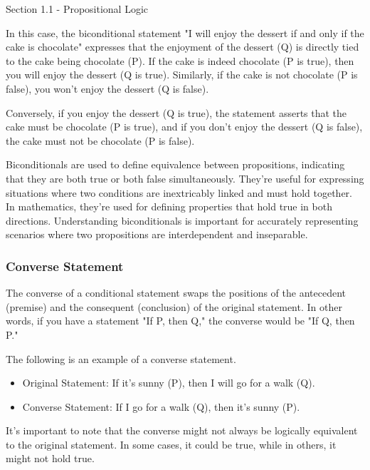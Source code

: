 \begin{notes}{Section 1.1 - Propositional Logic}
\begin{highlight}
        In this case, the biconditional statement "I will enjoy the dessert if and only if the cake is chocolate" expresses that the enjoyment of the dessert (Q) is directly tied to the cake being chocolate (P). If the cake 
        is indeed chocolate (P is true), then you will enjoy the dessert (Q is true). Similarly, if the cake is not chocolate (P is false), you won't enjoy the dessert (Q is false).

        Conversely, if you enjoy the dessert (Q is true), the statement asserts that the cake must be chocolate (P is true), and if you don't enjoy the dessert (Q is false), the cake must not be chocolate (P is false).
    \end{highlight}

    Biconditionals are used to define equivalence between propositions, indicating that they are both true or both false simultaneously. They're useful for expressing situations where two conditions are inextricably linked and 
    must hold together. In mathematics, they're used for defining properties that hold true in both directions. Understanding biconditionals is important for accurately representing scenarios where two propositions are 
    interdependent and inseparable.

    \subsubsection*{Converse Statement}

    The converse of a conditional statement swaps the positions of the antecedent (premise) and the consequent (conclusion) of the original statement. In other words, if you have a statement "If P, then Q," the converse would 
    be "If Q, then P."

    \begin{highlight}
        The following is an example of a converse statement.

        \begin{itemize}
            \item Original Statement: If it's sunny (P), then I will go for a walk (Q).
            \item Converse Statement: If I go for a walk (Q), then it's sunny (P).
        \end{itemize}

        It's important to note that the converse might not always be logically equivalent to the original statement. In some cases, it could be true, while in others, it might not hold true.
    \end{highlight}


\end{notes}
